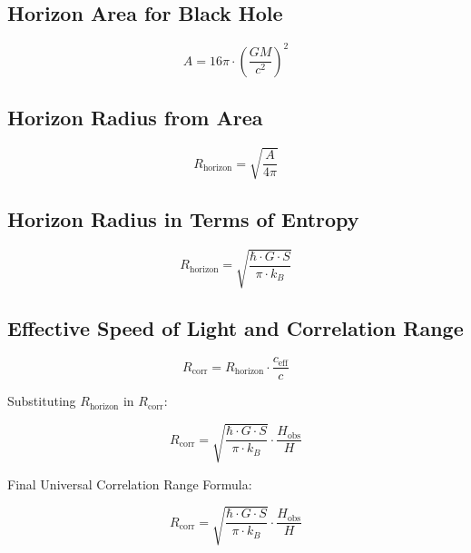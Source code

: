 \documentclass[a4paper, 11pt]{article}
\begin{document}
\subsection{Horizon Area for Black Hole}
\begin{equation}
A = 16\pi \cdot \left(\frac{GM}{c^2}\right)^2
\end{equation}

\subsection{Horizon Radius from Area}
\begin{equation}
R_{\text{horizon}} = \sqrt{\frac{A}{4 \pi}}
\end{equation}

\subsection{Horizon Radius in Terms of Entropy}
\begin{equation}
R_{\text{horizon}} = \sqrt{\frac{\hbar \cdot G \cdot S}{\pi \cdot k_B}}
\end{equation}

\subsection{Effective Speed of Light and Correlation Range}
\begin{equation}
R_{\text{corr}} = R_{\text{horizon}} \cdot \frac{c_{\text{eff}}}{c}
\end{equation}

Substituting \( R_{\text{horizon}} \) in \( R_{\text{corr}} \):

\begin{equation}
R_{\text{corr}} = \sqrt{\frac{\hbar \cdot G \cdot S}{\pi \cdot k_B}} \cdot \frac{H_{\text{obs}}}{H}
\end{equation}

Final Universal Correlation Range Formula:

\begin{equation}
R_{\text{corr}} = \sqrt{\frac{\hbar \cdot G \cdot S}{\pi \cdot k_B}} \cdot \frac{H_{\text{obs}}}{H}
\end{equation}
\end{document}
